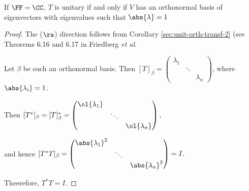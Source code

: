 \documentclass[11pt]{scrartcl}
\begin{document}
\begin{corollary}
  If $\FF = \CC$, $T$ is unitary if and only if $V$ has an orthonormal basis of eigenvectors with eigenvalues such that $\abs{\lambda} = 1$
\end{corollary}

\begin{proof}
  \hfill

  The ($\ra$) direction follows from Corollary \ref{sec:unit-orth-transf-2} (see Theorems 6.16 and 6.17 in Friedberg \textit{ et al}.

  Let $\beta$ be such an orthonormal basis. Then $[T]_{\beta} = 
  \begin{pmatrix}
    \lambda_1 & & \\
    & \ddots &\\
    && \lambda_n
  \end{pmatrix}$, where $\abs{\lambda_i} = 1$.

  Then $[T^{*}]_{\beta} = [T]^{*}_{\beta} = 
  \begin{pmatrix}
    \ol{\lambda_1} & & \\
    & \ddots &\\
    && \ol{\lambda_n}
  \end{pmatrix},$

  and hence $[T^{*}T]_{\beta} = 
  \begin{pmatrix}
    \abs{\lambda_1}^2 & &\\
      & \ddots &\\
      & & \abs{\lambda_n}^2
  \end{pmatrix} = I.
  $

  Theerefore, $T^{*}T = I$.
\end{proof}
\end{document}
